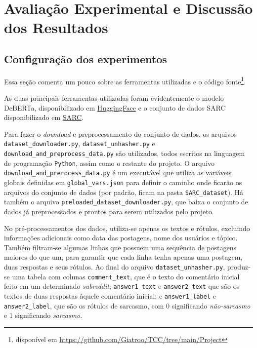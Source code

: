 

\chapter{Avaliação Experimental e Discussão dos Resultados}%
\label{cha:avaliacao_experimental_e_discussao_dos_resultados}

\section{Configuração dos experimentos}%
\label{sec:configuracao_dos_experimentos}

Essa seção comenta um pouco sobre as ferramentas utilizadas e o
código fonte\footnote{disponível em
\href{https://github.com/Giatroo/TCC/tree/main/Project}{https://github.com/Giatroo/TCC/tree/main/Project}}.

As duas principais ferramentas utilizadas foram evidentemente o modelo
DeBERTa, disponibilizado em
\href{https://huggingface.co/docs/transformers/model_doc/deberta}{HuggingFace}
e o conjunto de dados SARC disponibilizado em
\href{https://nlp.cs.princeton.edu/SARC/}{SARC}.

Para fazer o \textit{download} e preprocessamento do conjunto de dados, os
arquivos \texttt{dataset\_downloader.py}, \texttt{dataset\_unhasher.py} e
\texttt{download\_and\_preprocess\_data.py} são utilizados, todos escritos na
linguagem de programação \texttt{Python}, assim como o restante do projeto. O
arquivo \texttt{download\_and\_prerocess\_data.py} é um executável que utiliza
as variáveis globais definidas em \texttt{global\_vars.json} para definir o
caminho onde ficarão os arquivos do conjunto de dados (por padrão, ficam na
pasta \texttt{SARC\_dataset}). Há também o arquivo
\texttt{preloaded\_dataset\_downloader.py}, que baixa o conjunto de dados já
preprocessados e prontos para serem utilizados pelo projeto.

No pré-processamentos dos dados, utiliza-se apenas os textos e rótulos,
excluindo informações adicionais como data das postagens, nome dos usuários e
tópico. Também filtram-se algumas linhas que possuem uma sequência de postagens
maiores do que um, para garantir que cada linha tenha apenas uma postagem, duas
respostas e seus rótulos. Ao final do arquivo \texttt{dataset\_unhasher.py},
produz-se uma tabela com colunas \texttt{comment\_text}, que é o texto do
comentário inicial feito em um determinado \textit{subreddit};
\texttt{answer1\_text} e \texttt{answer2\_text} que são os textos de duas
respostas àquele comentário inicial; e \texttt{answer1\_label} e
\texttt{answer2\_label}, que são os rótulos de sarcasmo, com $0$ significando
\textit{não-sarcasmo} e $1$ significando \textit{sarcasmo}.

